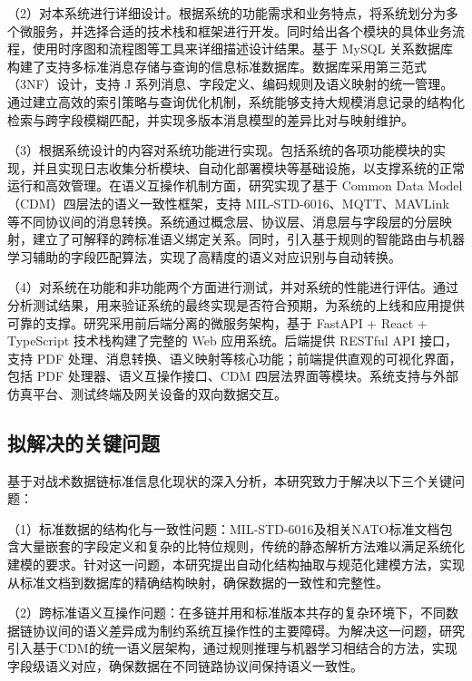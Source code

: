 （2）对本系统进行详细设计。根据系统的功能需求和业务特点，将系统划分为多个微服务，并选择合适的技术栈和框架进行开发。同时给出各个模块的具体业务流程，使用时序图和流程图等工具来详细描述设计结果。基于 MySQL 关系数据库构建了支持多标准消息存储与查询的信息标准数据库\cite{Laigner2021Data,Waseem2021Design}。数据库采用第三范式（3NF）设计，支持 J 系列消息、字段定义、编码规则及语义映射的统一管理。通过建立高效的索引策略与查询优化机制，系统能够支持大规模消息记录的结构化检索与跨字段模糊匹配，并实现多版本消息模型的差异比对与映射维护。

（3）根据系统设计的内容对系统功能进行实现。包括系统的各项功能模块的实现，并且实现日志收集分析模块、自动化部署模块等基础设施，以支撑系统的正常运行和高效管理。在语义互操作机制方面，研究实现了基于 Common Data Model（CDM）四层法的语义一致性框架，支持 MIL-STD-6016、MQTT、MAVLink 等不同协议间的消息转换\cite{Hamdan2023Reference,MITRE_Link16_Interoperability_2024}。系统通过概念层、协议层、消息层与字段层的分层映射，建立了可解释的跨标准语义绑定关系。同时，引入基于规则的智能路由与机器学习辅助的字段匹配算法，实现了高精度的语义对应识别与自动转换。

（4）对系统在功能和非功能两个方面进行测试，并对系统的性能进行评估。通过分析测试结果，用来验证系统的最终实现是否符合预期，为系统的上线和应用提供可靠的支撑。研究采用前后端分离的微服务架构，基于 FastAPI + React + TypeScript 技术栈构建了完整的 Web 应用系统\cite{Waseem2021Design,MonitoringTools2024}。后端提供 RESTful API 接口，支持 PDF 处理、消息转换、语义映射等核心功能；前端提供直观的可视化界面，包括 PDF 处理器、语义互操作接口、CDM 四层法界面等模块。系统支持与外部仿真平台、测试终端及网关设备的双向数据交互\cite{SAIC_JRE_Overview_2021,Collins_TTR_2021,L3Harris_STT_KOR24A_2020}。


\subsection{拟解决的关键问题}

基于对战术数据链标准信息化现状的深入分析，本研究致力于解决以下三个关键问题：

（1）标准数据的结构化与一致性问题：MIL-STD-6016及相关NATO标准文档包含大量嵌套的字段定义和复杂的比特位规则，传统的静态解析方法难以满足系统化建模的要求\cite{MIL_STD_6016_Active_2024,SISO_STD_002_2006}。针对这一问题，本研究提出自动化结构抽取与规范化建模方法，实现从标准文档到数据库的精确结构映射，确保数据的一致性和完整性。

（2）跨标准语义互操作问题：在多链并用和标准版本共存的复杂环境下，不同数据链协议间的语义差异成为制约系统互操作性的主要障碍\cite{Hamdan2023Reference,MITRE_Link16_Interoperability_2024}。为解决这一问题，研究引入基于CDM的统一语义层架构，通过规则推理与机器学习相结合的方法，实现字段级语义对应，确保数据在不同链路协议间保持语义一致性。

